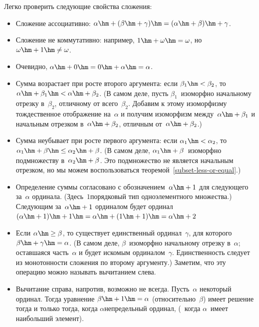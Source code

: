 Легко проверить следующие свойства сложения:
\begin{itemize}
\item Сложение ассоциативно:
$\alpha\hm+(\beta\hm+\gamma)\hm=(\alpha\hm+\beta)\hm+\gamma$.
\item Сложение не коммутативно: например,
$1\hm+\omega\hm=\omega$, но
$\omega\hm+1\hm\ne\omega$.
\item Очевидно, $\alpha\hm+0\hm=0\hm+\alpha\hm=\alpha$.
\item Сумма возрастает при росте
второго аргумента: если
$\beta_1\hm<\beta_2$, то $\alpha\hm+\beta_1\hm<\alpha\hm+\beta_2$.
(В самом деле, пусть $\beta_1$~изоморфно начальному отрезку в~$\beta_2$,
отличному от всего~$\beta_2$.  Добавим к этому изоморфизму
тождественное отображение на~$\alpha$ и получим изоморфизм
между~$\alpha\hm+\beta_1$ и начальным отрезком в~$\alpha\hm+\beta_2$, отличным
от~$\alpha\hm+\beta_2$.)
\item Сумма неубывает при росте первого аргумента: если
$\alpha_1\hm<\alpha_2$, то $\alpha_1\hm+\beta \hm\le
\alpha_2\hm+\beta$. (В самом деле, $\alpha_1\hm+\beta$~изоморфно
подмножеству в~$\alpha_2\hm+\beta$. Это подмножество не является
начальным отрезком, но мы можем воспользоваться
теоремой~\ref{subset-less-or-equal}.)
\item
Определение суммы согласовано с обозначением~$\alpha\hm+1$ для следующего
за~$\alpha$ ординала. (Здесь~$1$\т порядковый тип одноэлементного
множества.) Следующим за~$\alpha\hm+1$ ординалом будет ординал
$(\alpha\hm+1)\hm+1\hm=\alpha\hm+(1\hm+1)\hm=\alpha\hm+2$~
\item Если $\alpha\hm\ge\beta$, то существует единственный
ординал~$\gamma$,
для которого $\beta\hm+\gamma\hm=\alpha$. (В самом деле, $\beta$~изоморфно
начальному отрезку в~$\alpha$; оставшаяся часть~$\alpha$ и будет
искомым ординалом~$\gamma$. Единственность следует из монотонности
сложения по второму аргументу.) Заметим, что эту операцию можно называть
 вычитанием слева.
\item
{} Вычитание справа, напротив, возможно не всегда. Пусть~$\alpha$\т
некоторый ординал. Тогда уравнение $\beta\hm+1\hm=\alpha$ (относительно~$\beta$)
имеет решение тогда и только тогда, когда $\alpha$\т непредельный ординал,
(~когда $\alpha$~имеет наибольший элемент).
\end{itemize}

